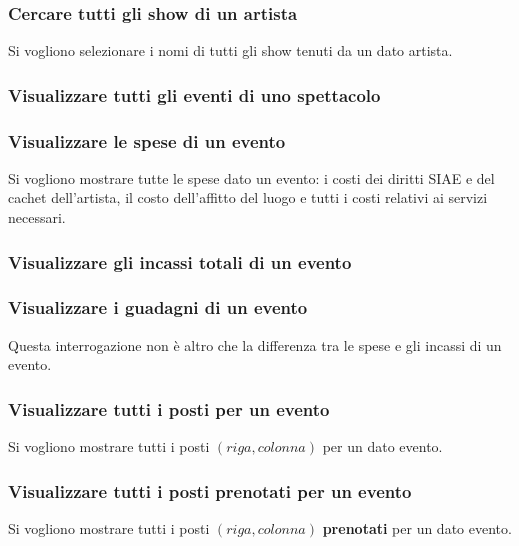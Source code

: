 \documentclass[a4paper,11pt]{article}
\begin{document}
\subsubsection{Cercare tutti gli show di un artista}
Si vogliono selezionare i nomi di tutti gli show tenuti da un dato artista.


\subsubsection{Visualizzare tutti gli eventi di uno spettacolo}


\subsubsection{Visualizzare le spese di un evento}
Si vogliono mostrare tutte le spese dato un evento: i costi dei diritti SIAE e del
cachet dell'artista, il costo dell'affitto del luogo e tutti i costi relativi ai
servizi necessari.


\subsubsection{Visualizzare gli incassi totali di un evento}


\subsubsection{Visualizzare i guadagni di un evento}
Questa interrogazione non è altro che la differenza tra le spese e gli incassi di un evento.


\subsubsection{Visualizzare tutti i posti per un evento}
Si vogliono mostrare tutti i posti $(riga, colonna)$ per un dato evento.


\subsubsection{Visualizzare tutti i posti prenotati per un evento}
Si vogliono mostrare tutti i posti $(riga, colonna)$ \textbf{prenotati} per un dato evento.

\end{document}
